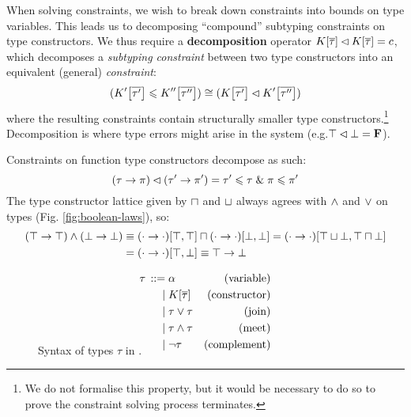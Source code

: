 When solving constraints, we wish to break down constraints into bounds on type variables. This leads us to decomposing \enquote{compound} subtyping constraints on type constructors. We thus require a \textbf{decomposition} operator $K[\overline \tau] \lhd K[\overline \tau] = c$, which decomposes a \emph{subtyping constraint} between two type constructors into an equivalent (general) \emph{constraint}:
$$ (\constr'\left[\overline {\tau'}\right] \sub \constr''\left[\overline {\tau''}\right]) \cstreq (\constr\left[\overline {\tau'}\right] \cdecomp \constr'\left[\overline {\tau''}\right]) $$
where the resulting constraints contain structurally smaller type constructors.\footnote{We do not formalise this property, but it would be necessary to do so to prove the constraint solving process terminates.} Decomposition is where type errors might arise in the system (e.g.\@ $\top \lhd \bot = \mathbf F$). 
\begin{example}
    Constraints on function type constructors decompose as such:
    $$ (\tau \to \pi) \lhd (\tau' \to \pi') = \tau' \leqslant \tau \;\&\; \pi \leqslant \pi' $$
    The type constructor lattice given by $\sqcap$ and $\sqcup$ always agrees with $\land$ and $\lor$ on types (Fig. \ref{fig:boolean-laws}), so:
    \begin{align*}
       (\top \to \top) \land (\bot \to \bot) 
       &\equiv (\cdot \to \cdot)[\top, \top] \sqcap (\cdot \to \cdot)[\bot, \bot] = (\cdot \to \cdot)[\top \sqcup \bot, \top \sqcap \bot] \\
       &= (\cdot \to \cdot)[\top, \bot] \equiv \top \to \bot 
    \end{align*}
\end{example}

\begin{figure}
    \centering
    \begin{align*}
    {\tau} \,::=&\; 
             \alpha & \text{(variable)}
    \\ \mid&\; K[\overline \tau] & \text{(constructor)}
    \\ \mid&\; \tau \lor \tau & \text{(join)}
    \\ \mid&\; \tau \land \tau & \text{(meet)}
    \\ \mid&\; \lnot \tau & \text{(complement)} \\[-2em]
    \end{align*}
    \caption{Syntax of types $\tau$ in \inference{}.}
    \label{fig:signature-types}
\end{figure}

